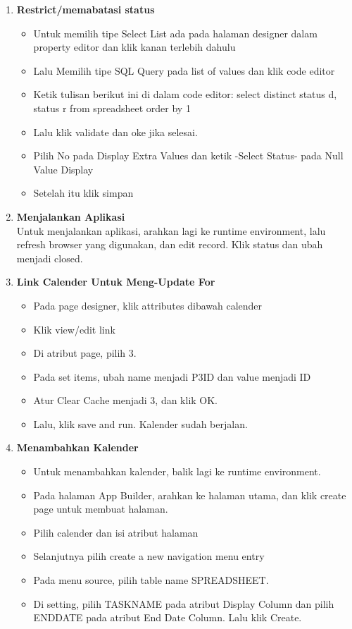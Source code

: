 \documentclass{article}
\begin{document}
\begin{enumerate}
\item \textbf{Restrict/memabatasi status}
\begin{itemize}
\item Untuk memilih tipe Select List ada pada halaman designer dalam property editor dan klik kanan terlebih dahulu
\item Lalu Memilih tipe SQL Query pada list of values dan klik code editor
\item Ketik tulisan berikut ini di dalam code editor: select distinct status d, status r from spreadsheet order by 1
\item Lalu klik validate dan oke jika selesai.
\item Pilih No pada Display Extra Values dan ketik -Select Status- pada Null Value Display
\item Setelah itu klik simpan\\
\end{itemize}
\item \textbf{Menjalankan Aplikasi}\\Untuk menjalankan aplikasi, arahkan lagi ke runtime environment, lalu refresh browser yang digunakan, dan edit record. Klik status dan ubah menjadi closed.\\
\item \textbf{Link Calender Untuk Meng-Update For}
\begin{itemize}
\item Pada page designer, klik attributes dibawah calender
\item Klik view/edit link
\item Di atribut page, pilih 3.
\item Pada set items, ubah name menjadi P3ID dan value menjadi ID
\item Atur Clear Cache menjadi 3, dan klik OK.
\item Lalu, klik save and run. Kalender sudah berjalan.\\

\end{itemize}
\item  \textbf{Menambahkan Kalender}
\begin{itemize}
\item  Untuk menambahkan kalender, balik lagi ke runtime environment.
\item Pada halaman App Builder, arahkan ke halaman utama, dan klik create page untuk membuat halaman.
\item Pilih calender dan isi atribut halaman
\item Selanjutnya pilih create a new navigation menu entry
\item Pada menu source, pilih table name SPREADSHEET.
\item Di setting, pilih TASKNAME pada atribut Display Column dan pilih ENDDATE pada atribut End Date Column. Lalu klik Create.\\
\end{itemize}


\end{enumerate}
\end{document}
